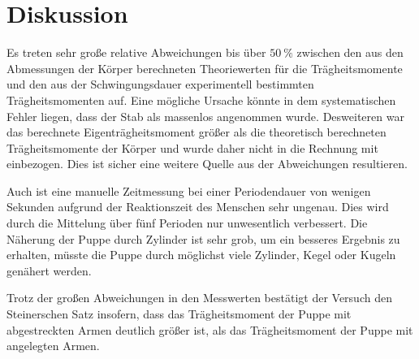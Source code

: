 \section{Diskussion}
\label{sec:Diskussion}
Es treten sehr große relative Abweichungen bis über $\SI{50}{\percent}$ zwischen
den aus den Abmessungen der Körper berechneten Theoriewerten für die Trägheitsmomente
und den aus der Schwingungsdauer experimentell bestimmten Trägheitsmomenten auf.
Eine mögliche Ursache könnte in dem systematischen Fehler liegen, dass der Stab
als massenlos angenommen wurde. Desweiteren war das berechnete Eigenträgheitsmoment
größer als die theoretisch berechneten Trägheitsmomente der Körper und wurde daher
nicht in die Rechnung mit einbezogen. Dies ist sicher eine weitere Quelle aus
der Abweichungen resultieren.

Auch ist eine manuelle Zeitmessung bei einer Periodendauer von wenigen Sekunden
aufgrund der Reaktionszeit des Menschen sehr ungenau. Dies wird durch die Mittelung
über fünf Perioden nur unwesentlich verbessert.
Die Näherung der Puppe durch Zylinder ist sehr grob, um ein besseres Ergebnis
zu erhalten, müsste die Puppe durch möglichst viele Zylinder, Kegel oder Kugeln
genähert werden.

Trotz der großen Abweichungen in den Messwerten bestätigt der Versuch den
Steinerschen Satz insofern, dass das Trägheitsmoment der Puppe mit abgestreckten
Armen deutlich größer ist, als das Trägheitsmoment der Puppe mit angelegten Armen.
